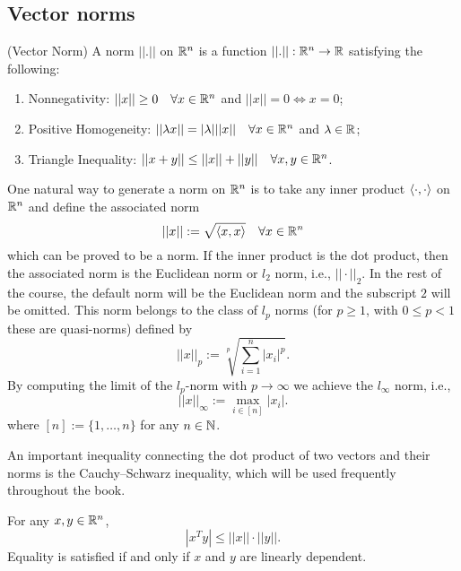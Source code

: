 \documentclass[10pt,a4paper]{article}
\begin{document}
\subsection{Vector norms}
\begin{definition} (Vector Norm)
	A norm $||.||$ on $\mathbb{R}^n$ is a function $||.||:\mathbb{R}^n \to \mathbb{R}$ satisfying the following:
	\begin{enumerate}
		\item Nonnegativity: $||x|| \geq 0 \quad \forall x \in \mathbb{R}^n$ and $||x|| = 0 \Leftrightarrow x =0$;
		\item Positive Homogeneity:  $||\lambda x|| = |\lambda| ||x|| \quad \forall x \in \mathbb{R}^n$ and $\lambda\in \mathbb{R}$;
		\item Triangle Inequality: $||x+y|| \leq ||x|| + ||y|| \quad \forall x,y \in \mathbb{R}^n$.
	\end{enumerate}
\end{definition}
One natural way to generate a norm on $\mathbb{R}^n$ is to take any inner product $\langle \cdot, \cdot \rangle$ on $\mathbb{R}^n$ and define the associated norm
\begin{equation*}
	||x||:= \sqrt{\langle x, x \rangle} \quad \forall x \in \mathbb{R}^n
\end{equation*}
which can be proved to be a norm. If the inner product is the dot product, then the associated norm is the Euclidean norm or $l_2$ norm, i.e., $||\cdot||_2$. In the rest of the course, the default norm will be the Euclidean norm and the subscript $2$ will be omitted. This norm belongs to the class of $l_p$ norms (for $p\geq 1$, with $0\leq p<1$ these are quasi-norms) defined by 
\begin{equation*}
	||x||_p:= \sqrt[p]{\sum_{i=1}^{n}|x_i|^p}.
\end{equation*}
By computing the limit of the $l_p$-norm with $p\to\infty$ we achieve the $l_{\infty}$ norm, i.e.,
\begin{equation*}
	||x||_{\infty} := \max_{i\in[n]} |x_i|.
\end{equation*}
where $[n]:=\{1, \dots,n\}$ for any $n \in \mathbb{N}$.
\par An important inequality connecting the dot product of two vectors and their norms is the Cauchy–Schwarz inequality, which will be used frequently throughout the book.
\begin{lemma}
	For any $x,y \in \mathbb{R}^n$,
	\begin{equation*}
		|x^Ty| \leq ||x||\cdot||y||.
	\end{equation*}
Equality is satisfied if and only if $x$ and $y$ are linearly dependent.
\end{lemma}
\end{document}
